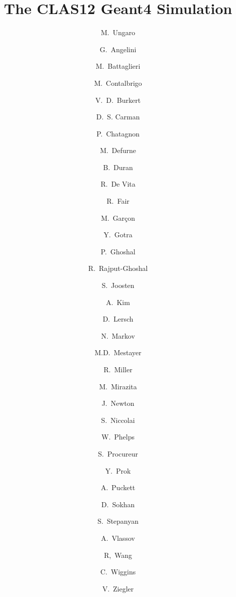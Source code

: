 \title{The CLAS12 Geant4 Simulation}




%


\author[JLAB]{M.~Ungaro}
\author[L]{G.~Angelini}
\author[INFNGE]{M.~Battaglieri}
\author[N]{M.~Contalbrigo}
\author[JLAB]{V.~D.~Burkert}
\author[JLAB]{D.~S. Carman}
\author[ORSAY]{P.~Chatagnon}
\author[SACLAY]{M.~Defurne}
\author[K]{B.~Duran}
\author[INFNGE]{R.~De Vita}
\author[JLAB]{R.~Fair}
\author[SACLAY]{M.~Gar\c con}
\author[JLAB]{Y.~Gotra}
\author[JLAB]{P.~Ghoshal}
\author[JLAB]{R.~Rajput-Ghoshal}
\author[O]{S.~Joosten}
\author[UCONN]{A.~Kim}
\author[J]{D.~Lersch}
\author[UCONN]{N.~Markov}
\author[JLAB]{M.D.~Mestayer}
\author[JLAB]{R.~Miller}
\author[M]{M.~Mirazita}
\author[H]{J.~Newton}
\author[ORSAY]{S.~Niccolai}
\author[L]{W.~Phelps}
\author[SACLAY]{S.~Procureur}
\author[H, I]{Y.~Prok}
\author[UCONN]{A.~Puckett}
\author[GLASGOW]{D.~Sokhan}
\author[JLAB]{S.~Stepanyan}
\author[G]{A.~Vlassov}
\author[ORSAY]{R,~Wang}
\author[JLAB]{C.~Wiggins}
\author[JLAB]{V.~Ziegler}

